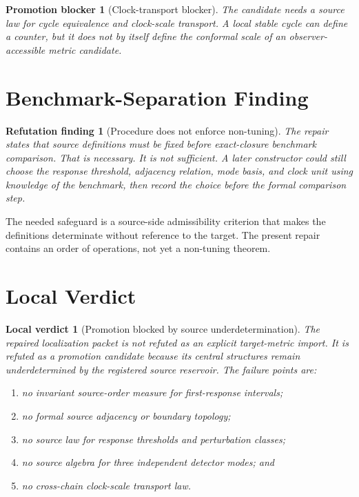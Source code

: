 \documentclass[11pt]{article}
\newtheorem{refutationfinding}{Refutation finding}
\newtheorem{blocker}{Promotion blocker}
\newtheorem{localverdict}{Local verdict}
\begin{document}
\begin{blocker}[Clock-transport blocker]
The candidate needs a source law for cycle equivalence and clock-scale
transport. A local stable cycle can define a counter, but it does not by itself
define the conformal scale of an observer-accessible metric candidate.
\end{blocker}

\section{Benchmark-Separation Finding}

\begin{refutationfinding}[Procedure does not enforce non-tuning]
The repair states that source definitions must be fixed before exact-closure
benchmark comparison. That is necessary. It is not sufficient. A later
constructor could still choose the response threshold, adjacency relation,
mode basis, and clock unit using knowledge of the benchmark, then record the
choice before the formal comparison step.
\end{refutationfinding}

The needed safeguard is a source-side admissibility criterion that makes the
definitions determinate without reference to the target. The present repair
contains an order of operations, not yet a non-tuning theorem.

\section{Local Verdict}

\begin{localverdict}[Promotion blocked by source underdetermination]
The repaired localization packet is not refuted as an explicit target-metric
import. It is refuted as a promotion candidate because its central structures
remain underdetermined by the registered source reservoir. The failure points
are:
\begin{enumerate}
    \item no invariant source-order measure for first-response intervals;
    \item no formal source adjacency or boundary topology;
    \item no source law for response thresholds and perturbation classes;
    \item no source algebra for three independent detector modes; and
    \item no cross-chain clock-scale transport law.
\end{enumerate}
\end{localverdict}
\end{document}
